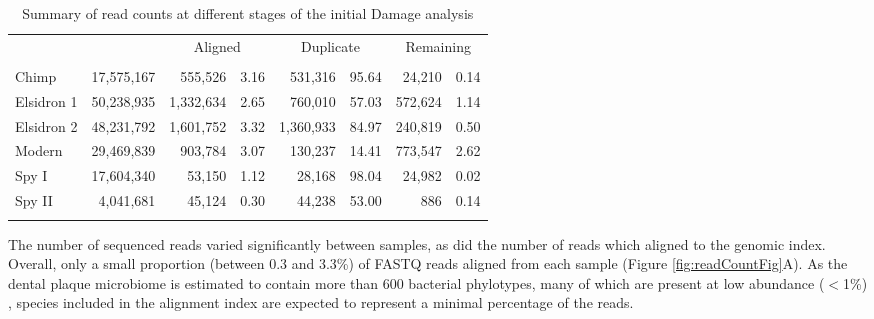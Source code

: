 \documentclass[12pt, a4paper]{article}
\renewcommand{\arraystretch}{1.2}
\newcommand{\ra}[1]{\renewcommand{\arraystretch}{#1}}
\begin{document}
\begin{table*}[h]\centering\small %
\ra{1.3}
\setlength{\tabcolsep}{8pt} %
\caption{Summary of read counts at different stages of the initial Damage analysis}
\begin{tabular}{@{}lrrrrrrr@{}}
	\toprule
	& & \multicolumn{2}{c}{Aligned} & \multicolumn{2}{c}{Duplicate} & \multicolumn{2}{c}{Remaining} \\
	\cmidrule(lr){3-4} \cmidrule(lr){5-6} \cmidrule(lr){7-8}
	\thead{Sample ID} & \thead{Sequenced} & \thead{Number} & \thead{\%} & \thead{Number} & \thead{\%} & \thead{Number} & \thead{\%} \\
	\midrule
	Chimp & 17,575,167 & 555,526 & 3.16 & 531,316 & 95.64 & 24,210 & 0.14 \\ 
 	Elsidron 1 & 50,238,935 & 1,332,634 & 2.65 & 760,010 & 57.03 & 572,624 & 1.14 \\ 
	Elsidron 2 & 48,231,792 & 1,601,752 & 3.32 & 1,360,933 & 84.97 & 240,819 & 0.50 \\ 
	Modern & 29,469,839 & 903,784 & 3.07 & 130,237 & 14.41 & 773,547 & 2.62 \\ 
 	Spy I & 17,604,340 & 53,150 & 1.12 & 28,168 & 98.04 & 24,982 & 0.02 \\	
	Spy II & 4,041,681 & 45,124 & 0.30 & 44,238 & 53.00 & 886 & 0.14 \\ 
\bottomrule\\
\end{tabular}
\end{table*}


The number of sequenced reads varied significantly between samples, as did the number of reads which aligned to the genomic index. 
Overall, only a small proportion (between 0.3 and 3.3\%) of FASTQ reads aligned from each sample (Figure \ref{fig:readCountFig}A). 
As the dental plaque microbiome is estimated to contain more than 600 bacterial phylotypes, many of which are present at low abundance ($<$1\%) \cite{Xie:2010aa}, species included in the alignment index are expected to represent a minimal percentage of the reads. 
\end{document}
